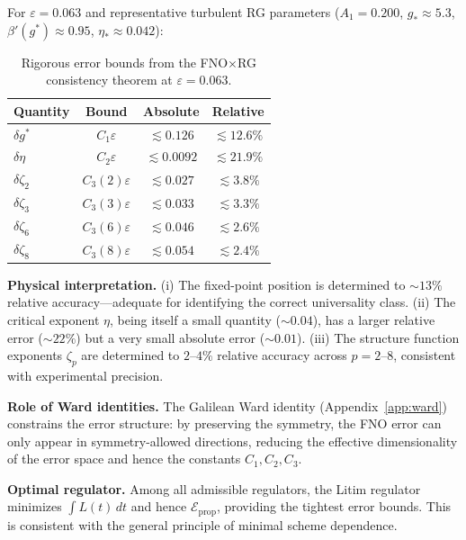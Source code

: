 For $\varepsilon = 0.063$ and representative turbulent RG parameters ($A_1 = 0.200$, $g_* \approx 5.3$, $\beta'(g^*) \approx 0.95$, $\eta_* \approx 0.042$):

\begin{table}[ht]
\centering \small
\caption{Rigorous error bounds from the FNO$\times$RG consistency theorem at $\varepsilon = 0.063$.}
\begin{ruledtabular}
\begin{tabular}{lccc}
\hline\hline
Quantity & Bound & Absolute & Relative \\
\hline
$\delta g^*$ & $C_1\varepsilon$ & $\lesssim 0.126$ & $\lesssim 12.6\%$ \\
$\delta\eta$ & $C_2\varepsilon$ & $\lesssim 0.0092$ & $\lesssim 21.9\%$ \\
$\delta\zeta_2$ & $C_3(2)\varepsilon$ & $\lesssim 0.027$ & $\lesssim 3.8\%$ \\
$\delta\zeta_3$ & $C_3(3)\varepsilon$ & $\lesssim 0.033$ & $\lesssim 3.3\%$ \\
$\delta\zeta_6$ & $C_3(6)\varepsilon$ & $\lesssim 0.046$ & $\lesssim 2.6\%$ \\
$\delta\zeta_8$ & $C_3(8)\varepsilon$ & $\lesssim 0.054$ & $\lesssim 2.4\%$ \\
\hline\hline
\end{tabular}
\end{ruledtabular}
\end{table}

\textbf{Physical interpretation.} (i) The fixed-point position is determined to $\sim 13\%$ relative accuracy---adequate for identifying the correct universality class. (ii) The critical exponent $\eta$, being itself a small quantity ($\sim 0.04$), has a larger relative error ($\sim 22\%$) but a very small absolute error ($\sim 0.01$). (iii) The structure function exponents $\zeta_p$ are determined to $2$--$4\%$ relative accuracy across $p=2$--$8$, consistent with experimental precision.

\textbf{Role of Ward identities.} The Galilean Ward identity (Appendix~\ref{app:ward}) constrains the error structure: by preserving the symmetry, the FNO error can only appear in symmetry-allowed directions, reducing the effective dimensionality of the error space and hence the constants $C_1, C_2, C_3$.

\textbf{Optimal regulator.} Among all admissible regulators, the Litim regulator minimizes $\int L(t)\,dt$ and hence $\mathcal{E}_{\mathrm{prop}}$, providing the tightest error bounds. This is consistent with the general principle of minimal scheme dependence.

